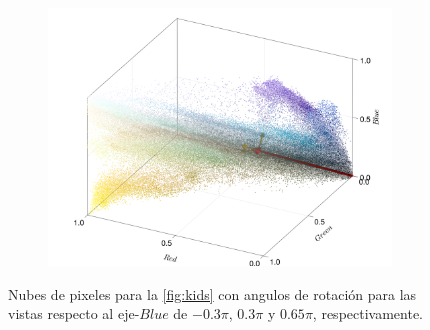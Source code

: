 \begin{figure}[ht!]
\begin{subfigure}[c]{0.3\textwidth}
        \includegraphics[scale=0.09]{../pictures/pixel_cloud_kids_3}
    \end{subfigure}
    \caption{Nubes de pixeles para la \cref{fig:kids} con angulos de rotación para las vistas respecto al eje-$Blue$ de $-0.3\pi$, $0.3\pi$ y $0.65\pi$, respectivamente.}
    \label{fig:nube-pixeles-kids}
\end{figure}

